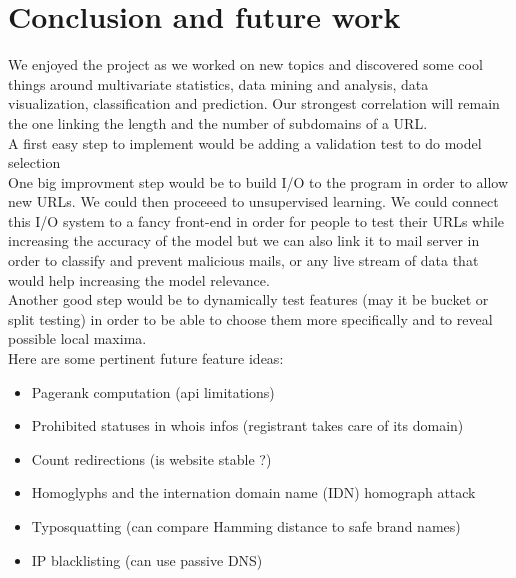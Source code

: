 \documentclass[conference,11pt]{IEEEtran}
\begin{document}
\section{Conclusion and future work}
We enjoyed the project as we worked on new topics and discovered some cool
things around multivariate statistics, data mining and analysis, data
visualization, classification and prediction. Our strongest correlation will
remain the one linking the length and the number of subdomains of a URL. \\
A first easy step to implement would be adding a validation test to do model
selection \cite{validation-set} \\
One big improvment step would be to build I/O to the program in order to allow
new URLs. We could then proceeed to unsupervised learning. We could connect this
I/O system to a fancy front-end in order for people to test their URLs while
increasing the accuracy of the model but we can also link it to mail server in
order to classify and prevent malicious mails, or any live stream of data that
would help increasing the model relevance. \\
Another good step would be to dynamically test features (may it be bucket or
split testing) in order to be able to choose them more specifically and to
reveal possible local maxima. \\

Here are some pertinent future feature ideas:
\begin{itemize}
  \item Pagerank computation (api limitations)
  \item Prohibited statuses in whois infos (registrant takes care of its domain)
  \item Count redirections (is website stable ?)
  \item Homoglyphs and the internation domain name (IDN) homograph attack
  \item Typosquatting (can compare Hamming distance to safe brand names)
  \item IP blacklisting (can use passive DNS)
\end{itemize}



\end{document}
